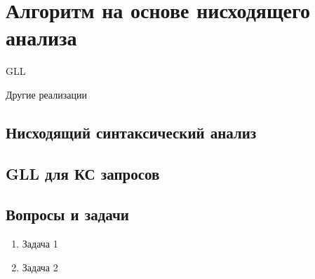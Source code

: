 \section{Алгоритм на основе нисходящего анализа}

GLL~\cite{Grigorev:2017:CPQ:3166094.3166104}

Другие реализации~\cite{MEDEIROS201975}

\subsection{Нисходящий синтаксический анализ}

\subsection{GLL для КС запросов}

\subsection{Вопросы и задачи}
\begin{enumerate}
  \item Задача 1
  \item Задача 2
\end{enumerate}
